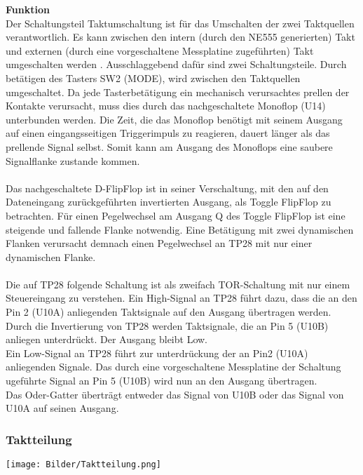 \documentclass[a4paper,11pt]{scrartcl}
\begin{document}
\textbf{Funktion}
\\
Der Schaltungsteil \glqq Taktumschaltung \grqq{} ist für das Umschalten der zwei Taktquellen verantwortlich. Es kann zwischen den intern (durch den NE555 generierten) Takt und externen (durch eine vorgeschaltene Messplatine zugeführten) Takt umgeschalten werden . Ausschlaggebend dafür sind zwei Schaltungsteile. Durch betätigen des Tasters SW2 (MODE), wird zwischen den Taktquellen umgeschaltet. Da jede Tasterbetätigung ein mechanisch verursachtes prellen der Kontakte verursacht, muss dies durch das nachgeschaltete  Monoflop (U14) unterbunden werden. Die Zeit, die das Monoflop benötigt mit seinem Ausgang auf einen eingangsseitigen Triggerimpuls zu reagieren, dauert länger als das prellende Signal selbst. Somit kann am Ausgang des Monoflops eine saubere Signalflanke zustande kommen. 
\\
\\
Das nachgeschaltete D-FlipFlop ist in seiner Verschaltung, mit den auf den Dateneingang zurückgeführten invertierten Ausgang, als Toggle FlipFlop zu betrachten. Für einen Pegelwechsel am Ausgang Q des Toggle FlipFlop ist eine steigende und fallende Flanke notwendig. Eine Betätigung mit zwei dynamischen Flanken verursacht demnach einen Pegelwechsel an TP28 mit nur einer dynamischen Flanke. 
\\
\\
Die auf TP28 folgende Schaltung ist als zweifach TOR-Schaltung mit nur einem Steuereingang zu verstehen. Ein High-Signal an TP28 führt dazu, dass die an den Pin 2 (U10A) anliegenden Taktsignale auf den Ausgang übertragen werden. Durch die Invertierung von TP28 werden Taktsignale, die an Pin 5 (U10B) anliegen unterdrückt. Der Ausgang bleibt Low.
\\
Ein Low-Signal an TP28 führt zur unterdrückung der an Pin2 (U10A) anliegenden Signale. Das durch eine vorgeschaltene Messplatine der Schaltung ugeführte Signal an Pin 5 (U10B) wird nun an den Ausgang übertragen.
\\
Das Oder-Gatter überträgt entweder das Signal von U10B oder das Signal von U10A auf seinen Ausgang. 

\newpage

\subsubsection{Taktteilung}

\begin{center}
\texttt{[image: Bilder/Taktteilung.png]}
\end{center}
\end{document}
